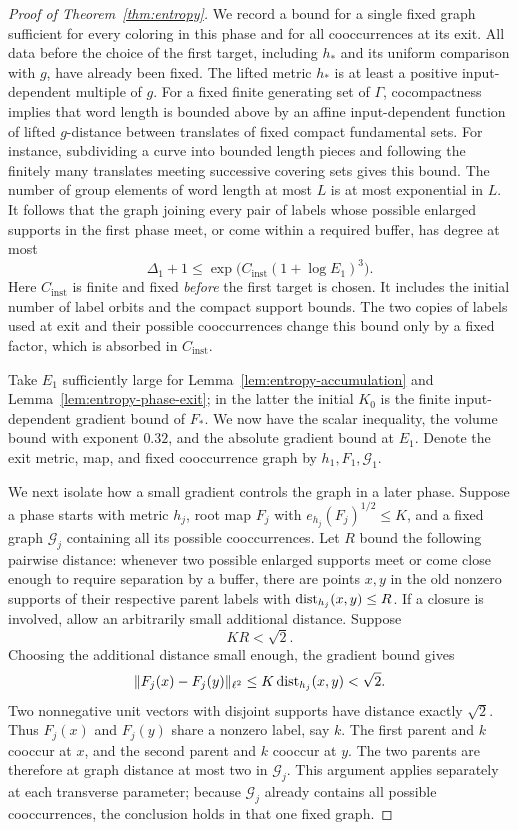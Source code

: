 \begin{proof}[Proof of Theorem~\ref{thm:entropy}]
We record a bound for a single fixed graph sufficient for every
coloring in this phase and for all cooccurrences at its exit.  All
data before the choice of the first target, including \(h_*\) and its
uniform comparison with \(g\), have already been fixed.  The lifted
metric \(h_*\) is at least a positive input-dependent multiple of \(g\).
For a fixed finite generating set of \(\Gamma\), cocompactness implies
that word length is bounded above by an affine input-dependent
function of lifted \(g\)-distance between translates of fixed compact
fundamental sets.  For instance, subdividing a curve into bounded
length pieces and following the finitely many translates meeting
successive covering sets gives this bound.  The number of group
elements of word length at most \(L\) is at most exponential in \(L\).
It follows that the graph joining every pair of labels whose possible
enlarged supports in the first phase meet, or come within a required
buffer, has degree at most
\begin{equation}\label{eq:entropy-first-graph}
 \Delta_1+1\leq
 \exp\bigl(C_{\mathrm{inst}}(1+\log E_1)^3\bigr).
\end{equation}
Here \(C_{\mathrm{inst}}\) is finite and fixed \emph{before} the
first target is chosen.  It includes the initial number of label
orbits and the compact support bounds.  The two copies of labels
used at exit and their possible cooccurrences change this bound only
by a fixed factor, which is absorbed in \(C_{\mathrm{inst}}\).

Take \(E_1\) sufficiently large for
Lemma~\ref{lem:entropy-accumulation} and
Lemma~\ref{lem:entropy-phase-exit}; in the latter the initial \(K_0\)
is the finite input-dependent gradient bound of \(F_*\).
We now have the scalar inequality, the volume bound with exponent
\(0.32\), and the absolute gradient bound at \(E_1\).
Denote the exit metric, map, and fixed cooccurrence graph by
\(h_1,F_1,\mathcal G_1\).

We next isolate how a small gradient controls the graph in a later
phase.  Suppose a phase starts with metric \(h_j\), root map \(F_j\)
with \(e_{h_j}(F_j)^{1/2}\leq K\), and a fixed graph \(\mathcal G_j\)
containing all its possible cooccurrences.  Let \(R\) bound the
following pairwise distance: whenever two possible enlarged supports
meet or come close enough to require separation by a buffer, there
are points \(x,y\) in the old nonzero supports of their respective
parent labels with \(\operatorname{dist}_{h_j}(x,y)\leq R\).  If a closure is
involved, allow an arbitrarily small additional distance.  Suppose
\[
 KR<\sqrt2.
\]
Choosing the additional distance small enough, the gradient bound gives
\[
 \|F_j(x)-F_j(y)\|_{\ell^2}
 \leq K\operatorname{dist}_{h_j}(x,y)<\sqrt2.
\]
Two nonnegative unit vectors with disjoint supports have distance
exactly \(\sqrt2\).  Thus \(F_j(x)\) and \(F_j(y)\) share a nonzero
label, say \(k\).  The first parent and \(k\) cooccur at \(x\), and
the second parent and \(k\) cooccur at \(y\).  The two parents are
therefore at graph distance at most two in \(\mathcal G_j\).  This
argument applies separately at each transverse parameter; because
\(\mathcal G_j\) already contains all possible cooccurrences, the
conclusion holds in that one fixed graph.


\end{proof}

